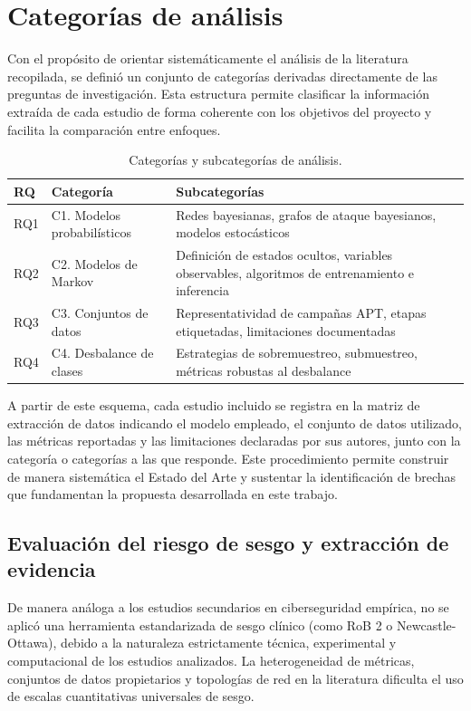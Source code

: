 \section{Categorías de análisis}

Con el propósito de orientar sistemáticamente el análisis de la literatura recopilada, se definió un conjunto de categorías derivadas directamente de las preguntas de investigación. Esta estructura permite clasificar la información extraída de cada estudio de forma coherente con los objetivos del proyecto y facilita la comparación entre enfoques.

\begin{table}[h!]
\centering
\small
\caption{Categorías y subcategorías de análisis.}
\begin{tabular}{p{1.0cm} p{4.6cm} p{9.6cm}}
\hline
\textbf{RQ} & \textbf{Categoría} & \textbf{Subcategorías} \\
\hline
RQ1 & C1. Modelos probabilísticos & Redes bayesianas, grafos de ataque bayesianos, modelos \newline estocásticos \\
RQ2 & C2. Modelos de Markov & Definición de estados ocultos, variables observables, \newline algoritmos de entrenamiento e inferencia \\
RQ3 & C3. Conjuntos de datos & Representatividad de campañas APT, etapas etiquetadas, \newline limitaciones documentadas \\
RQ4 & C4. Desbalance de clases & Estrategias de sobremuestreo, submuestreo, métricas robustas al desbalance \\
\hline
\end{tabular}
\end{table}
\FloatBarrier

A partir de este esquema, cada estudio incluido se registra en la matriz de extracción de datos indicando el modelo empleado, el conjunto de datos utilizado, las métricas reportadas y las limitaciones declaradas por sus autores, junto con la categoría o categorías a las que responde. Este procedimiento permite construir de manera sistemática el Estado del Arte y sustentar la identificación de brechas que fundamentan la propuesta desarrollada en este trabajo.

\subsection{Evaluación del riesgo de sesgo y extracción de evidencia}
De manera análoga a los estudios secundarios en ciberseguridad empírica, no se aplicó una herramienta estandarizada de sesgo clínico (como RoB 2 o Newcastle-Ottawa), debido a la naturaleza estrictamente técnica, experimental y computacional de los estudios analizados. La heterogeneidad de métricas, conjuntos de datos propietarios y topologías de red en la literatura dificulta el uso de escalas cuantitativas universales de sesgo.

